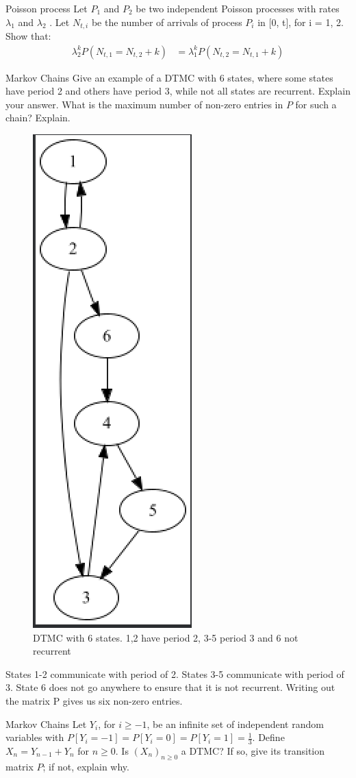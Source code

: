 \begin{problem}{Poisson process}
Let $P_1$ and $P_2$ be two independent Poisson processes with rates
$\lambda_1$ and $\lambda_2$ . Let $N_{t,i}$ be the number of arrivals of process $P_i$ in [0, t], for i = 1, 2. Show that:
\begin{align*}
    \lambda_2^k P(N_{t,1} = N_{t,2} + k)
    &=\lambda_1^k P(N _{t,2} = N_{t,1} + k)
\end{align*}
\end{problem}

\begin{problem}{Markov Chains}
Give an example of a DTMC with 6 states, where some states have period 2 and others have period 3, while not all states are recurrent. Explain your answer. What is the maximum number of non-zero entries in \( P \) for such a chain? Explain.
\end{problem}
\begin{solution}
    \begin{figure}[h!]
        \begin{center}
            \includegraphics[height=0.5\textwidth]{img/21.2.png}
        \end{center}
        \caption{DTMC with 6 states. 1,2 have period 2, 3-5 period 3 and 6 not recurrent}
    \end{figure}
\end{solution}
States 1-2 communicate with period of 2. States 3-5 communicate with period of 3. State 6 does not go anywhere to ensure that it is not recurrent. Writing out the matrix P gives us six non-zero entries.\\
\begin{problem}{Markov Chains}
Let \( Y_i \), for \( i \geq -1 \), be an infinite set of independent random variables with \( P [Y_i = -1] = P [Y_i = 0] = P [Y_i = 1] = \frac{1}{3} \). Define \( X_n = Y_{n-1} + Y_n \) for \( n \geq 0 \). Is \( (X_n)_{n \geq 0} \) a DTMC? If so, give its transition matrix \( P \); if not, explain why.
\end{problem}

